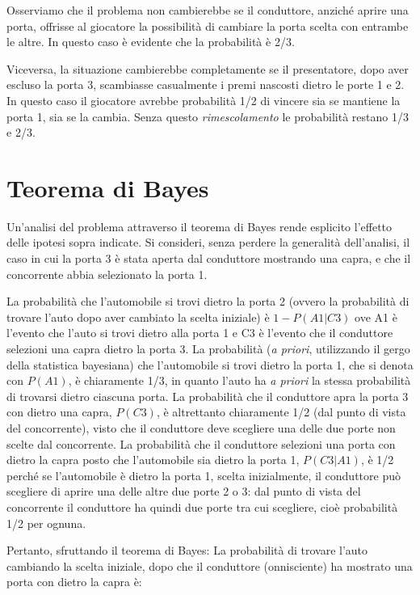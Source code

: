 \documentclass[a4paper, 12pt]{report}
\begin{document}
Osserviamo che il problema non cambierebbe se il conduttore, anziché aprire una porta, offrisse al giocatore la possibilità di cambiare la porta scelta con entrambe le altre. In questo caso è evidente che la probabilità è 2/3.

Viceversa, la situazione cambierebbe completamente se il presentatore, dopo aver escluso la porta 3, scambiasse casualmente i premi nascosti dietro le porte 1 e 2. In questo caso il giocatore avrebbe probabilità 1/2 di vincere sia se mantiene la porta 1, sia se la cambia. Senza questo \textit{rimescolamento} le probabilità restano 1/3 e 2/3.

\section{Teorema di Bayes}
Un'analisi del problema attraverso il teorema di Bayes rende esplicito l'effetto delle ipotesi sopra indicate. Si consideri, senza perdere la generalità dell'analisi, il caso in cui la porta 3 è stata aperta dal conduttore mostrando una capra, e che il concorrente abbia selezionato la porta 1.

La probabilità che l'automobile si trovi dietro la porta 2 (ovvero la probabilità di trovare l'auto dopo aver cambiato la scelta iniziale) è \(1-P(A1|C3)\) ove A1 è l'evento che l'auto si trovi dietro alla porta 1 e C3 è l'evento che il conduttore selezioni una capra dietro la porta 3. La probabilità (\textit{a priori}, utilizzando il gergo della statistica bayesiana) che l'automobile si trovi dietro la porta 1, che si denota con \(P(A1)\), è chiaramente 1/3, in quanto l'auto ha \textit{a priori} la stessa probabilità di trovarsi dietro ciascuna porta. La probabilità che il conduttore apra la porta 3 con dietro una capra, \(P(C3)\), è altrettanto chiaramente 1/2 (dal punto di vista del concorrente), visto che il conduttore deve scegliere una delle due porte non scelte dal concorrente. La probabilità che il conduttore selezioni una porta con dietro la capra posto che l'automobile sia dietro la porta 1, \(P(C3|A1)\), è 1/2 perché se l'automobile è dietro la porta 1, scelta inizialmente, il conduttore può scegliere di aprire una delle altre due porte 2 o 3: dal punto di vista del concorrente il conduttore ha quindi due porte tra cui scegliere, cioè probabilità 1/2 per ognuna.

Pertanto, sfruttando il teorema di Bayes:
\newline
La probabilità di trovare l'auto cambiando la scelta iniziale, dopo che il conduttore (onnisciente) ha mostrato una porta con dietro la capra è:
\end{document}
